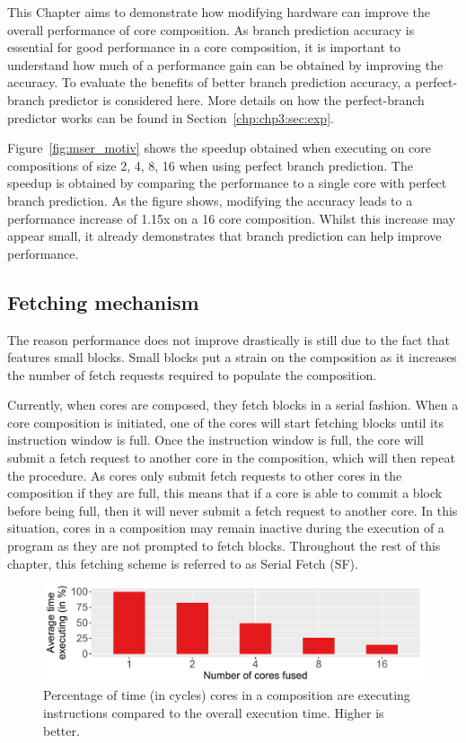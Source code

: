 This Chapter aims to demonstrate how modifying hardware can improve the overall performance of core composition.
As branch prediction accuracy is essential for good performance in a core composition, it is important to understand how much of a performance gain can be obtained by improving the accuracy.
To evaluate the benefits of better branch prediction accuracy, a perfect-branch predictor is considered here.
More details on how the perfect-branch predictor works can be found in Section~\ref{chp:chp3:sec:exp}.


Figure~\ref{fig:mser_motiv} shows the speedup obtained when executing  on core compositions of size 2, 4, 8, 16 when using perfect branch prediction.
The speedup is obtained by comparing the performance to a single core with perfect branch prediction.
As the figure shows, modifying the accuracy leads to a performance increase of 1.15x on a 16 core composition.
Whilst this increase may appear small, it already demonstrates that branch prediction can help improve performance.

\subsection{Fetching mechanism}

The reason performance does not improve drastically is still due to the fact that  features small blocks.
Small blocks put a strain on the composition as it increases the number of fetch requests required to populate the composition.

Currently, when cores are composed, they fetch blocks in a serial fashion.
When a core composition is initiated, one of the cores will start fetching blocks until its instruction window is full.
Once the instruction window is full, the core will submit a fetch request to another core in the composition, which will then repeat the procedure.
As cores only submit fetch requests to other cores in the composition if they are full, this means that if a core is able to commit a block before being full, then it will never submit a fetch request to another core.
In this situation, cores in a composition may remain inactive during the execution of a program as they are not prompted to fetch blocks.
Throughout the rest of this chapter, this fetching scheme is referred to as Serial Fetch (SF).%

\begin{figure}[t]
    \centering
    \includegraphics[width=1\textwidth]{chapter3/graphics/mser_active_16.pdf}
    \caption{Percentage of time (in cycles) cores in a composition are executing instructions compared to the overall execution time. Higher is better.}
    \label{fig:motivation_perc}
	\vspace{-1em}
\end{figure}

